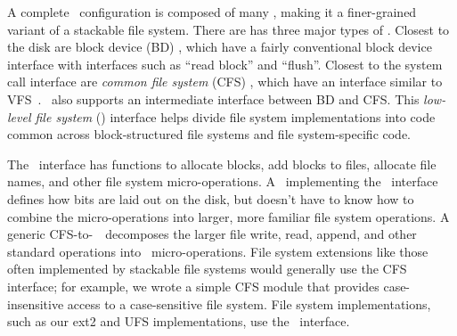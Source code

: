 
\label{sec:modules:interfaces}

\begin{comment}
New \modules\ are
simple to write, and by changing the \module\ arrangement, a broad range of
behaviors can be implemented. It's also easy to tell what behavior a given
arrangement will give just by looking at the connections between the \modules.
\end{comment}

A complete \Kudos\ configuration is composed of many \modules, making it
a finer-grained variant of a stackable file system.
%
There are has three major types of \modules.
%
Closest to the disk are block device (BD) \modules, which have a fairly
conventional block device interface with interfaces such as ``read block'' and
``flush''. 
%
Closest to the system call interface are \emph{common file system} (CFS)
\modules, which have an interface similar to VFS~\cite{kleiman86vnodes}. 
%
\Kudos\ also supports an intermediate interface between BD and CFS.
%
This \emph{low-level file system} (\LFS) interface helps divide file system
implementations into code common across block-structured file systems and
file system-specific code.
%
\begin{comment}
A
\Kudos\ file system designer combines modules with all three interfaces in many
ways -- a departure from stackable file systems, which act only at the VFS/CFS
layer. \Kudos\ \modules\ are implemented in C using structures of function
pointers to achieve object oriented behavior, very much like the rest of the
Linux kernel.
\end{comment}
%
The \LFS\ interface has functions to allocate blocks, add blocks to files,
allocate file names, and other file system micro-operations. A \module\ implementing
the \LFS\ interface defines how bits are laid out on the disk, but doesn't
have to know how to combine the micro-operations into larger, more familiar file system
operations. A generic CFS-to-\LFS\ \module\ decomposes the larger file write,
read, append, and other standard operations into \LFS\ micro-operations. 
%
File system extensions like those often implemented by stackable file
systems would generally use the CFS interface; for example, we wrote a
simple CFS module that provides case-insensitive access to a case-sensitive
file system.
%
File system implementations, such as our ext2 and UFS implementations, use
the \LFS\ interface.



